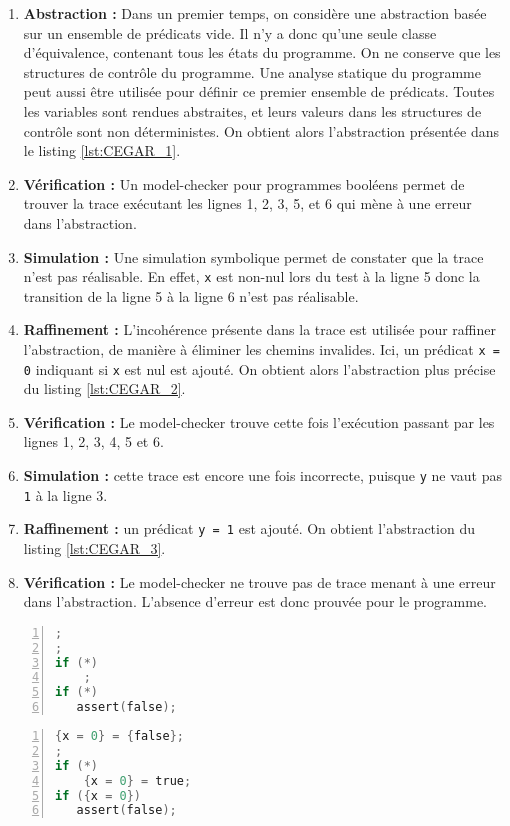 \begin{enumerate}
\def\labelenumi{\arabic{enumi})}
\item
  \textbf{Abstraction :} Dans un premier temps, on considère une abstraction
  basée sur un ensemble de prédicats vide. Il n'y a donc qu'une seule classe
  d'équivalence, contenant tous les états du programme. On ne conserve que les
  structures de contrôle du programme. Une analyse statique du programme peut
  aussi être utilisée pour définir ce premier ensemble de prédicats.
  Toutes les variables sont rendues abstraites, et leurs valeurs dans
  les structures de contrôle sont non déterministes. On obtient alors
  l'abstraction présentée dans le listing \ref{lst:CEGAR_1}.
\item
  \textbf{Vérification :} Un model-checker pour programmes booléens permet de
  trouver la trace exécutant les lignes 1, 2, 3, 5, et 6 qui mène à une erreur
  dans l'abstraction.
\item
  \textbf{Simulation :} Une simulation symbolique permet de constater que la
  trace n'est pas réalisable. En effet, \texttt{x} est non-nul lors
  du test à la ligne 5 donc la transition de la ligne 5 à la ligne 6 n'est pas
  réalisable.
\item
  \textbf{Raffinement :} L'incohérence présente dans la trace est utilisée pour
  raffiner l'abstraction, de manière à éliminer les chemins invalides. Ici, un
  prédicat \texttt{{x = 0}} indiquant si \texttt{x} est nul est ajouté. On
  obtient alors l'abstraction plus précise du listing \ref{lst:CEGAR_2}.
\item
  \textbf{Vérification :} Le model-checker trouve cette fois l'exécution
  passant par les lignes 1, 2, 3, 4, 5 et 6.
\item
  \textbf{Simulation :} cette trace est encore une fois incorrecte, puisque
  \texttt{y} ne vaut pas \texttt{1} à la ligne 3.
\item
  \textbf{Raffinement :} un prédicat \texttt{{y = 1}} est ajouté. On obtient
  l'abstraction du listing \ref{lst:CEGAR_3}.
\item
  \textbf{Vérification :} Le model-checker ne trouve pas de trace menant à une
  erreur dans l'abstraction. L'absence d'erreur est donc prouvée pour le
  programme.
\end{enumerate}

\noindent\begin{minipage}{.45\textwidth}
  \begin{lstlisting}[language=C, label=lst:CEGAR_1, numbers=left, frame=single,
    caption=Abstraction initiale, xleftmargin=1.6em]
;
;
if (*)
    ;
if (*)
   assert(false);
\end{lstlisting}
\end{minipage}\hfill
\begin{minipage}{.45\textwidth}
  \begin{lstlisting}[language=C, label=lst:CEGAR_2, numbers=left, frame=single,
    caption=Premier raffinement, xleftmargin=1.6em]
{x = 0} = {false};
;
if (*)
    {x = 0} = true;
if ({x = 0})
   assert(false);
\end{lstlisting}
\end{minipage}

